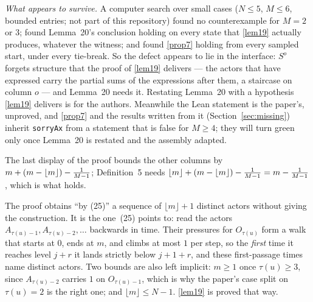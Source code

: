 \begin{remark}
  \emph{What appears to survive.}  A computer search over small cases ($N \le 5$,
  $M \le 6$, bounded entries; not part of this repository) found no
  counterexample for $M = 2$ or $3$; found Lemma~20's conclusion holding on
  every state that \ref{lem19} actually produces, whatever the witness; and
  found \ref{prop7} holding from every sampled start, under every tie-break.  So
  the defect appears to lie in the interface: $S^o$ forgets structure that the
  proof of \ref{lem19} delivers --- the actors that have expressed carry the
  partial sums of the expressions after them, a staircase on column $o$ --- and
  Lemma~20 needs it.  Restating Lemma~20 with a hypothesis \ref{lem19}
  delivers is for the authors.  Meanwhile the Lean statement is the paper's,
  unproved, and \ref{prop7} and the results written from it
  (Section~\ref{sec:missing}) inherit \texttt{sorryAx} from a statement that is
  false for $M \ge 4$; they will turn green only once Lemma~20 is restated and
  the assembly adapted.
\end{remark}

\begin{remark}
  \label{note-lem19}
  The last display of the proof bounds the other columns by $m + (m - \lfloor m
  \rfloor) - \tfrac{1}{M-1}$; Definition~5 needs $\lfloor m \rfloor + (m - \lfloor m
  \rfloor) - \tfrac{1}{M-1} = m - \tfrac{1}{M-1}$, which is what holds.

  The proof obtains ``by (25)'' a sequence of $\lfloor m \rfloor + 1$ distinct
  actors without giving the construction.  It is the one~(25) points to: read
  the actors $A_{\tau(u)-1}, A_{\tau(u)-2}, \dots$ backwards in time.  Their
  pressures for $O_{\tau(u)}$ form a walk that starts at $0$, ends at $m$, and
  climbs at most $1$ per step, so the \emph{first} time it reaches level $j + r$
  it lands strictly below $j + 1 + r$, and these first-passage times name
  distinct actors.  Two bounds are also left implicit: $m \ge 1$ once $\tau(u)
  \ge 3$, since $A_{\tau(u)-2}$ carries $1$ on $O_{\tau(u)-1}$, which is why the
  paper's case split on $\tau(u) = 2$ is the right one; and $\lfloor m \rfloor
  \le N - 1$.  \ref{lem19} is proved that way.
\end{remark}


